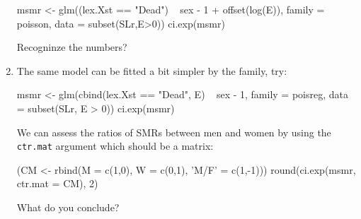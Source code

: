 \begin{enumerate}[resume]
\begin{Schunk}
\begin{Sinput}
 msmr <- glm((lex.Xst == "Dead") ~ sex - 1 + offset(log(E)),
              family = poisson,
              data = subset(SLr,E>0))
 ci.exp(msmr)
\end{Sinput}
\end{Schunk}
  Recogninze the numbers?
\item The same model can be fitted a bit simpler by the
 family, try:
\begin{Schunk}
\begin{Sinput}
 msmr <- glm(cbind(lex.Xst == "Dead", E) ~ sex - 1,
             family = poisreg,
               data = subset(SLr, E > 0))
 ci.exp(msmr)
\end{Sinput}
\end{Schunk}
  We can assess the ratios of SMRs between men and women by using the
  \texttt{ctr.mat} argument which should be a matrix:
\begin{Schunk}
\begin{Sinput}
 (CM <- rbind(M = c(1,0),
              W = c(0,1),
          'M/F' = c(1,-1)))
 round(ci.exp(msmr, ctr.mat = CM), 2)
\end{Sinput}
\end{Schunk}
What do you conclude?
\end{enumerate}
